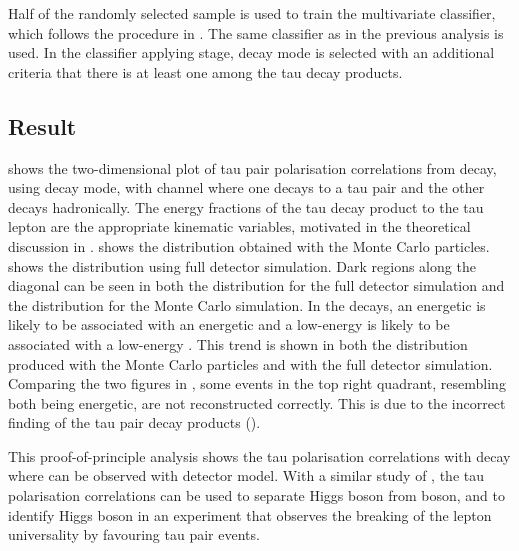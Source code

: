 Half of the randomly selected sample is used to train the multivariate classifier,  which follows the procedure in  . The same classifier as in the previous analysis  is used.   In the classifier applying stage, \tauToPion decay mode is selected with an additional criteria that there is at least one \Ppipm among the tau decay products.

\subsection{Result}

 shows the two-dimensional plot of tau pair polarisation correlations from \PZ decay,  using \tauToPion decay mode, with \eeZZ channel where one \PZ decays to a tau pair and the other \PZ decays hadronically. The energy fractions of the tau decay product to the tau lepton are the appropriate kinematic variables, motivated in the theoretical discussion in .  shows the distribution obtained with the Monte Carlo particles.  shows the distribution using full detector simulation. Dark regions along the diagonal can be seen in both the distribution for the full detector simulation and the distribution for the Monte Carlo simulation. In the \ZToTauTau decays, an energetic \Ppiplus is likely to be associated with an energetic \Ppiminus and a low-energy \Ppiplus is  likely to be associated with a low-energy \Ppiminus. This trend is shown in both the distribution produced with the Monte Carlo particles and with the full detector simulation. Comparing the two figures in , some events in the top right quadrant, resembling both \Ppipm being energetic, are not reconstructed correctly. This is due to the incorrect finding of the tau pair decay products ().

This proof-of-principle analysis shows the tau polarisation correlations with \ZToTauTau decay where \tauToPion can be observed with \ILD detector model. With a similar study of \HiggsToTauTau,  the tau polarisation correlations can be used to separate Higgs boson from \PZ boson, and to identify Higgs boson in an experiment that observes the breaking of the lepton universality by favouring tau pair events.


